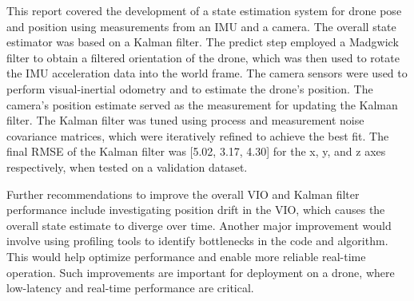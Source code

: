 \documentclass[bare_jrnl_transmag]{subfiles}
\begin{document}
This report covered the development of a state estimation system for drone pose and position using measurements from an IMU and a camera. The overall state estimator was based on a Kalman filter. The predict step employed a Madgwick filter to obtain a filtered orientation of the drone, which was then used to rotate the IMU acceleration data into the world frame. The camera sensors were used to perform visual-inertial odometry and to estimate the drone's position. The camera's position estimate served as the measurement for updating the Kalman filter. The Kalman filter was tuned using process and measurement noise covariance matrices, which were iteratively refined to achieve the best fit. The final RMSE of the Kalman filter was [5.02, 3.17, 4.30] for the x, y, and z axes respectively, when tested on a validation dataset. \newline

Further recommendations to improve the overall VIO and Kalman filter performance include investigating position drift in the VIO, which causes the overall state estimate to diverge over time. Another major improvement would involve using profiling tools to identify bottlenecks in the code and algorithm. This would help optimize performance and enable more reliable real-time operation. Such improvements are important for deployment on a drone, where low-latency and real-time performance are critical.
\end{document}
